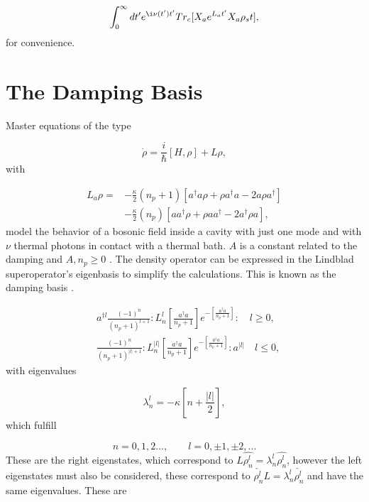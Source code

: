 \documentclass[reprint, amsmath,amssymb, aps,pra]{revtex4-1}
\begin{document}
\begin{equation}
\int_0^\infty dt' e^{\i\nu(t')t'}Tr_c[X_a e^{L_a t'} X_a \rho_st], 
\end{equation} for convenience.


\section{The Damping Basis}\label{App1}

Master equations of the type 

\begin{equation}
\dot{\rho} = \frac{i}{\hbar}[H,\rho]+L\rho, 
\end{equation} with

\begin{align}\label{EMField}
L_a \rho =& - \frac{\kappa}{2}(n_p+1)[a^\dagger a\rho + \rho a^\dagger a -2a\rho a^\dagger] \nonumber \\
 &- \frac{\kappa}{2}(n_p)[ aa^\dagger\rho + \rho  aa^\dagger -2a^\dagger\rho a],
\end{align} model the behavior of a bosonic field inside a cavity with just one mode and with $\nu$ thermal photons in contact with a thermal bath. $A$ is a constant related to the damping and $A,n_p \geq 0$  \cite{EnglertDB}. The density operator can be expressed in the Lindblad superoperator's eigenbasis to simplify the calculations. This is known as the damping basis \cite{EnglertDB}.

\begin{align}\label{DefDB}
&a^{\dagger l}\frac{(-1)^n}{(n_p+1)^{l+1}}:L_n^l[\frac{a^\dagger a}{n_p+1}]e^{-[\frac{a^\dagger a}{n_p+1}]}:\quad l \geq 0, \\
&\frac{(-1)^n}{(n_p+1)^{|l|+1}}:L_n^{|l|}[\frac{a^\dagger a}{n_p+1}]e^{-[\frac{a^\dagger a}{n_p+1}]}:a^{|l|}\quad l \leq 0,
\end{align} with eigenvalues

\begin{equation}
\lambda_n^l = -\kappa[n + \frac{|l|}{2}],
\end{equation} which fulfill

\begin{equation}
n=0,1,2...,\qquad l = 0,\pm 1, \pm 2,... 
\end{equation} These are the right eigenstates, which correspond to $L\hat{\rho_n^l} = \lambda_n^l\hat{\rho_n^l}$, however the left eigenstates must also be considered, these correspond to $\check{\rho_n^l}L = \lambda_n^l\check{\rho_n^l}$ and have the same eigenvalues. These are
\end{document}

